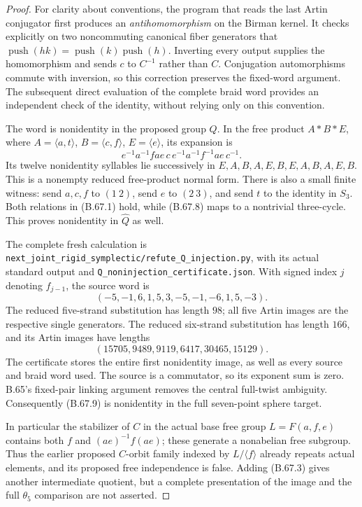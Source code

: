 \begin{proof}
For clarity about conventions, the program that reads
the last Artin conjugator first produces an
\emph{antihomomorphism} on the Birman kernel.
It checks explicitly on two noncommuting canonical
fiber generators that
$\operatorname{push}(hk)=\operatorname{push}(k)
\operatorname{push}(h)$.
Inverting every output supplies the homomorphism and
sends $c$ to $C^{-1}$ rather than $C$.
Conjugation automorphisms commute with inversion, so
this correction preserves the fixed-word argument.
The subsequent direct evaluation of the complete
braid word provides an independent check of the
identity, without relying only on this convention.

The word is nonidentity in the proposed group $Q$.
In the free product $A*B*E$, where
$A=\langle a,t\rangle$, $B=\langle c,f\rangle$,
$E=\langle e\rangle$, its expansion is
\[
 e^{-1}a^{-1}fae\,c\,e^{-1}a^{-1}f^{-1}ae\,c^{-1}.
                                                               \tag{B.67.8}
\]
Its twelve nonidentity syllables lie successively in
$E,A,B,A,E,B,E,A,B,A,E,B$.
This is a nonempty reduced free-product normal form.
There is also a small finite witness: send $a,c,f$
to $(1\ 2)$, send $e$ to $(2\ 3)$, and send $t$
to the identity in $S_3$.
Both relations in (B.67.1) hold, while (B.67.8)
maps to a nontrivial three-cycle.
This proves nonidentity in $\widehat Q$ as well.

The complete fresh calculation is
\nolinkurl{next_joint_rigid_symplectic/refute_Q_injection.py},
with its actual standard output and
\nolinkurl{Q_noninjection_certificate.json}.
With signed index $j$ denoting $f_{j-1}$, the source word is
\[
              (-5,-1,6,1,5,3,-5,-1,-6,1,5,-3).
                                                               \tag{B.67.9}
\]
The reduced five-strand substitution has length $98$;
all five Artin images are the respective single
generators.  The reduced six-strand substitution has
length $166$, and its Artin images have lengths
\[
                   (15705,9489,9119,6417,30465,15129).
                                                               \tag{B.67.10}
\]
The certificate stores the entire first nonidentity
image, as well as every source and braid word used.
The source is a commutator, so its exponent sum is zero.
B.65's fixed-pair linking argument removes the central
full-twist ambiguity.  Consequently (B.67.9) is
nonidentity in the full seven-point sphere target.

In particular the stabilizer of $C$ in the actual base
free group $L=F(a,f,e)$ contains both $f$ and
$(ae)^{-1}f(ae)$; these generate a nonabelian free
subgroup.  Thus the earlier proposed $C$-orbit family
indexed by $L/\langle f\rangle$ already repeats actual
elements, and its proposed free independence is false.
Adding (B.67.3) gives another intermediate quotient,
but a complete presentation of the image and the
full $\theta_5$ comparison are not asserted.
\end{proof}

